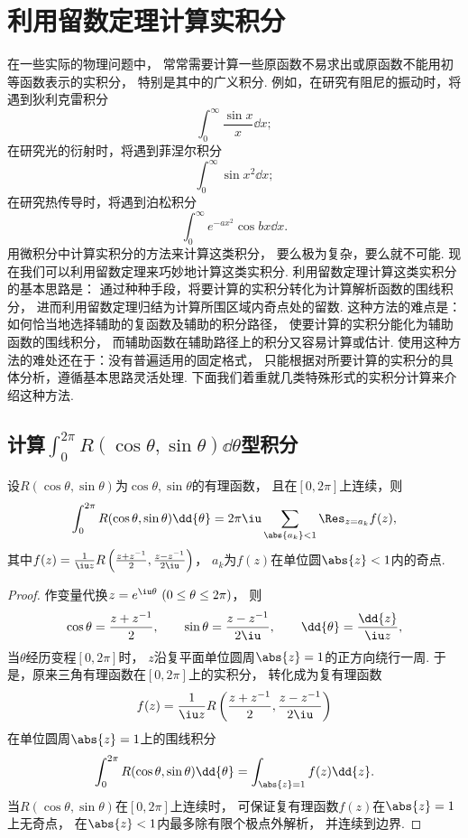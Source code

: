 \section{利用留数定理计算实积分}
在一些实际的物理问题中，
常常需要计算一些原函数不易求出或原函数不能用初等函数表示的实积分，
特别是其中的广义积分.
例如，在研究有阻尼的振动时，将遇到狄利克雷积分\[
	\int_0^\infty \frac{\sin x}{x} \dd{x};
\]
在研究光的衍射时，将遇到菲涅尔积分\[
	\int_0^\infty \sin x^2 \dd{x};
\]
在研究热传导时，将遇到泊松积分\[
	\int_0^\infty e^{-ax^2} \cos bx \dd{x}.
\]
用微积分中计算实积分的方法来计算这类积分，
要么极为复杂，要么就不可能.
现在我们可以利用留数定理来巧妙地计算这类实积分.
利用留数定理计算这类实积分的基本思路是：
通过种种手段，将要计算的实积分转化为计算解析函数的围线积分，
进而利用留数定理归结为计算所围区域内奇点处的留数.
这种方法的难点是：如何恰当地选择辅助的复函数及辅助的积分路径，
使要计算的实积分能化为辅助函数的围线积分，
而辅助函数在辅助路径上的积分又容易计算或估计.
使用这种方法的难处还在于：没有普遍适用的固定格式，
只能根据对所要计算的实积分的具体分析，遵循基本思路灵活处理.
下面我们着重就几类特殊形式的实积分计算来介绍这种方法.

\subsection{计算\texorpdfstring{\(\int_0^{2\pi} R(\cos\theta,\sin\theta) \dd{\theta}\)型}{在[0,2π]区间上的含有三角函数的}积分}
\begin{theorem}\label{theorem:留数定理.利用留数定理计算实积分1}
设\(R(\cos\theta,\sin\theta)\)为\(\cos\theta,\sin\theta\)的有理函数，
且在\([0,2\pi]\)上连续，则\[
	\int_0^{2\pi} R(\cos\theta,\sin\theta) \dd{\theta}
	= 2\pi\iu \sum_{\abs{a_k}<1} \Res_{z=a_k} f(z),
\]
其中\(f(z) = \frac{1}{\iu z} R\left(\frac{z+z^{-1}}{2},\frac{z-z^{-1}}{2\iu}\right)\)，
\(a_k\)为\(f(z)\)在单位圆\(\abs{z}<1\)内的奇点.
\begin{proof}
作变量代换\(z = e^{\iu\theta}\ (0\leq\theta\leq2\pi)\)，
则\[
	\cos\theta = \frac{z+z^{-1}}{2},
	\qquad
	\sin\theta = \frac{z-z^{-1}}{2\iu},
	\qquad
	\dd{\theta} = \frac{\dd{z}}{\iu z},
\]
当\(\theta\)经历变程\([0,2\pi]\)时，
\(z\)沿复平面单位圆周\(\abs{z}=1\)的正方向绕行一周.
于是，原来三角有理函数在\([0,2\pi]\)上的实积分，
转化成为复有理函数\[
	f(z) = \frac{1}{\iu z} R\left(\frac{z+z^{-1}}{2},\frac{z-z^{-1}}{2\iu}\right)
\]在单位圆周\(\abs{z}=1\)上的围线积分\[
	\int_0^{2\pi} R(\cos\theta,\sin\theta) \dd{\theta}
	= \int_{\abs{z}=1} f(z) \dd{z}.
\]
当\(R(\cos\theta,\sin\theta)\)在\([0,2\pi]\)上连续时，
可保证复有理函数\(f(z)\)在\(\abs{z}=1\)上无奇点，
在\(\abs{z}<1\)内最多除有限个极点外解析，
并连续到边界.
\end{proof}
\end{theorem}

